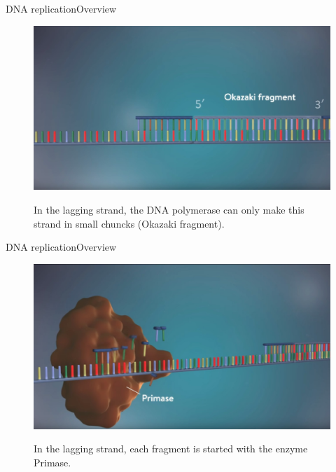 \documentclass[10pt]{beamer}
\begin{document}
{%
\begin{frame}{DNA replication}{Overview}
	\begin{figure}[]
		\centering
		\includegraphics[width=\textwidth,height=0.6\textheight,keepaspectratio]{img/introduction/dna39.jpg}
		\label{img:mot2}
		\caption{In the lagging strand, the DNA polymerase can only make this strand in small chuncks (Okazaki fragment). }
	\end{figure}
\end{frame}

\begin{frame}{DNA replication}{Overview}
	\begin{figure}[]
		\centering
		\includegraphics[width=\textwidth,height=0.6\textheight,keepaspectratio]{img/introduction/dna40.jpg}
		\label{img:mot2}
		\caption{In the lagging strand, each fragment is started with the enzyme Primase. }
	\end{figure}
\end{frame}

}
\end{document}
